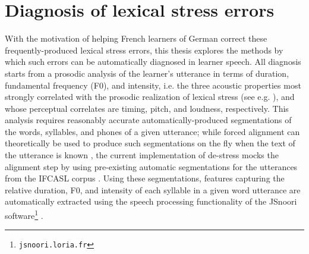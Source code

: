 \documentclass[11pt,a4paper,onecolumn]{article}
\newcommand{\TODO}[1]{{\color{red}\textbf{[TODO #1]}}}
\begin{document}
\section{Diagnosis of lexical stress errors}
\label{sec:diag}

With the motivation of helping French learners of German correct these frequently-produced lexical stress errors, this thesis explores the methods by which such errors can be automatically diagnosed in learner speech. 
%
All diagnosis starts from a prosodic analysis of the learner's utterance in terms of duration, fundamental frequency (F0), and intensity, i.e. the three acoustic properties most strongly correlated with the prosodic realization of lexical stress (see e.g. \cite{Dogil1999,Cutler2005}), and whose perceptual correlates are timing, pitch, and loudness, respectively. %
This analysis requires reasonably accurate automatically-produced segmentations of the words, syllables, and phones of a given utterance; while forced alignment can theoretically be used to produce such segmentations on the fly when the text of the utterance is known \citep[e.g.]{Mesbahi2011}, the current implementation of de-stress mocks the alignment step by using pre-existing automatic segmentations for the utterances from the IFCASL corpus \citep{Fauth2014}.
Using these segmentations, features capturing the relative duration, F0, and intensity of each syllable in a given word utterance are automatically extracted using the speech processing functionality of the JSnoori software\footnote{\texttt{jsnoori.loria.fr}} \citep{Laprie1999,DiMartino1999}.

	
	
	
\end{document}
